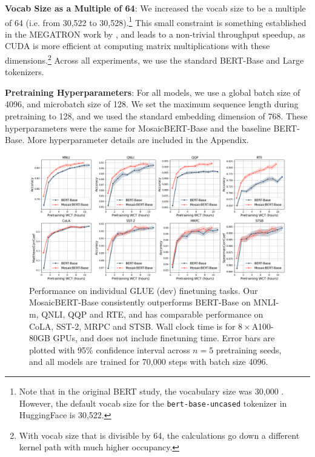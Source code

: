\documentclass{article}
\begin{document}
\textbf{Vocab Size as a Multiple of 64}:
We increased the vocab size to be a multiple of 64 (i.e. from 30,522 to 30,528).\footnote{Note that in the original BERT study, the vocabulary size was 30,000 \citep{devlin2018bert}. However, the default vocab size for the \texttt{bert-base-uncased} tokenizer in HuggingFace is 30,522.} This small constraint is something established in the MEGATRON work by \citet{shoeybi2019megatron}, and leads to a non-trivial throughput speedup, as CUDA is more efficient at computing matrix multiplications with these dimensions.\footnote{With vocab size that is divisible by 64, the calculations go down a different kernel path with much higher occupancy.}  Across all experiments, we use the standard BERT-Base and Large tokenizers.

\textbf{Pretraining Hyperparameters}:
For all models, we use a global batch size of 4096, and microbatch size of 128.  We set the maximum sequence length during pretraining to 128, and we used the standard embedding dimension of 768. These hyperparameters were the same for MosaicBERT-Base and the baseline BERT-Base. More hyperparameter details are included in the Appendix.


\begin{figure}
    \centering
    \includegraphics[width=\textwidth]{figures/bert-base-glue-individual-7-7-545pm.png}
    \caption{Performance on individual GLUE (dev) finetuning tasks. Our MosaicBERT-Base consistently outperforms BERT-Base on MNLI-m, QNLI, QQP and RTE, and has comparable performance on CoLA, SST-2, MRPC and STSB. Wall clock time is for $8\times$A100-80GB GPUs, and does not include finetuning time. Error bars are plotted with 95\% confidence interval across $n=5$ pretraining seeds, and all models are trained for 70,000 steps with batch size 4096.}
    \label{fig:bert_base_glue_individual}
\end{figure}
\end{document}
